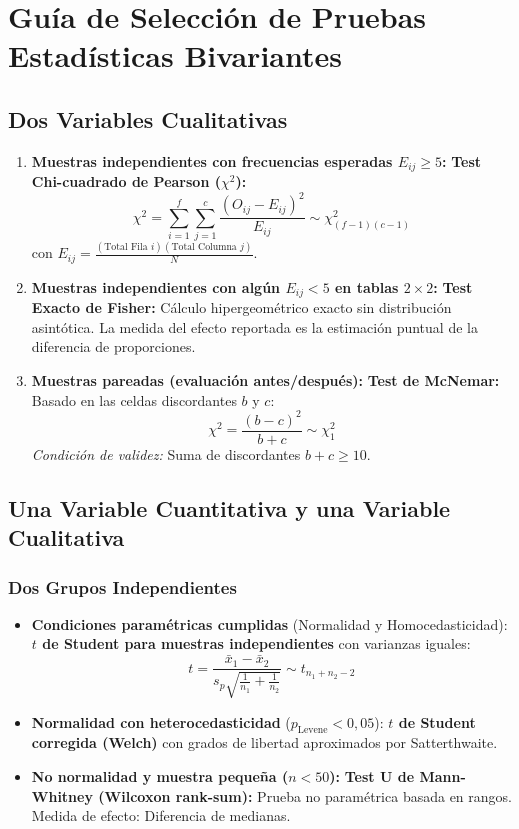 \documentclass[11pt,a4paper]{report}
\theoremstyle{definition}
\begin{document}
\section{Guía de Selección de Pruebas Estadísticas Bivariantes}

\subsection{Dos Variables Cualitativas}
\begin{enumerate}[leftmargin=*]
    \item \textbf{Muestras independientes con frecuencias esperadas $E_{ij} \ge 5$:}
    \textbf{Test Chi-cuadrado de Pearson ($\chi^2$):}
    \begin{equation}
    \chi^2 = \sum_{i=1}^f \sum_{j=1}^c \frac{(O_{ij} - E_{ij})^2}{E_{ij}} \sim \chi^2_{(f-1)(c-1)}
    \end{equation}
    con $E_{ij} = \frac{(\text{Total Fila } i)(\text{Total Columna } j)}{N}$.
    \item \textbf{Muestras independientes con algún $E_{ij} < 5$ en tablas $2 \times 2$:}
    \textbf{Test Exacto de Fisher:}
    Cálculo hipergeométrico exacto sin distribución asintótica. La medida del efecto reportada es la estimación puntual de la diferencia de proporciones.
    \item \textbf{Muestras pareadas (evaluación antes/después):}
    \textbf{Test de McNemar:}
    Basado en las celdas discordantes $b$ y $c$:
    \begin{equation}
    \chi^2 = \frac{(b - c)^2}{b + c} \sim \chi^2_1
    \end{equation}
    \emph{Condición de validez:} Suma de discordantes $b + c \ge 10$.
\end{enumerate}

\subsection{Una Variable Cuantitativa y una Variable Cualitativa}

\subsubsection{Dos Grupos Independientes}
\begin{itemize}[leftmargin=*]
    \item \textbf{Condiciones paramétricas cumplidas} (Normalidad y Homocedasticidad):
    \textbf{$t$ de Student para muestras independientes} con varianzas iguales:
    \begin{equation}
    t = \frac{\bar{x}_1 - \bar{x}_2}{s_p \sqrt{\frac{1}{n_1} + \frac{1}{n_2}}} \sim t_{n_1 + n_2 - 2}
    \end{equation}
    \item \textbf{Normalidad con heterocedasticidad} ($p_{\text{Levene}} < 0{,}05$):
    \textbf{$t$ de Student corregida (Welch)} con grados de libertad aproximados por Satterthwaite.
    \item \textbf{No normalidad y muestra pequeña ($n < 50$):}
    \textbf{Test U de Mann-Whitney (Wilcoxon rank-sum):}
    Prueba no paramétrica basada en rangos. Medida de efecto: Diferencia de medianas.
\end{itemize}
\end{document}
